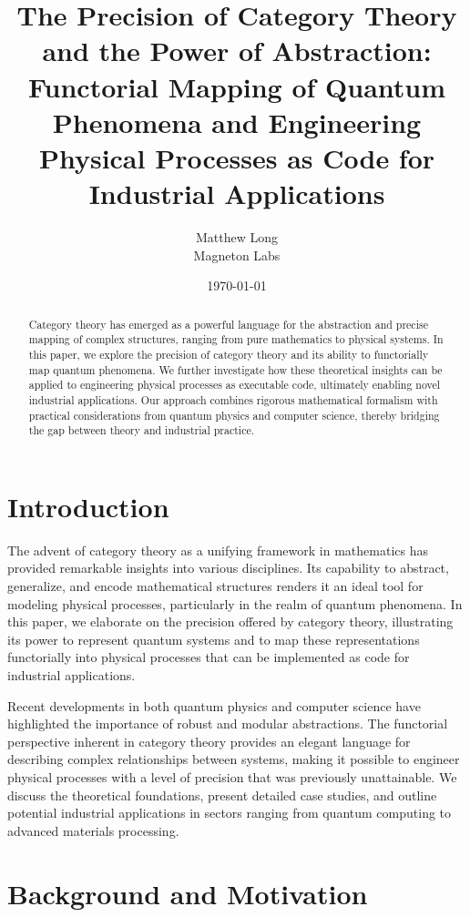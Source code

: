 \documentclass[11pt]{article}
\title{The Precision of Category Theory and the Power of Abstraction: \\ Functorial Mapping of Quantum Phenomena and Engineering Physical Processes as Code for Industrial Applications}
\author{Matthew Long \\ Magneton Labs}
\date{\today}
\begin{document}
\maketitle

\begin{abstract}
Category theory has emerged as a powerful language for the abstraction and precise mapping of complex structures, ranging from pure mathematics to physical systems. In this paper, we explore the precision of category theory and its ability to functorially map quantum phenomena. We further investigate how these theoretical insights can be applied to engineering physical processes as executable code, ultimately enabling novel industrial applications. Our approach combines rigorous mathematical formalism with practical considerations from quantum physics and computer science, thereby bridging the gap between theory and industrial practice.
\end{abstract}

\newpage

\tableofcontents

\newpage

\section{Introduction}
The advent of category theory as a unifying framework in mathematics has provided remarkable insights into various disciplines. Its capability to abstract, generalize, and encode mathematical structures renders it an ideal tool for modeling physical processes, particularly in the realm of quantum phenomena. In this paper, we elaborate on the precision offered by category theory, illustrating its power to represent quantum systems and to map these representations functorially into physical processes that can be implemented as code for industrial applications.

Recent developments in both quantum physics and computer science have highlighted the importance of robust and modular abstractions. The functorial perspective inherent in category theory provides an elegant language for describing complex relationships between systems, making it possible to engineer physical processes with a level of precision that was previously unattainable. We discuss the theoretical foundations, present detailed case studies, and outline potential industrial applications in sectors ranging from quantum computing to advanced materials processing.

\section{Background and Motivation}
\end{document}
